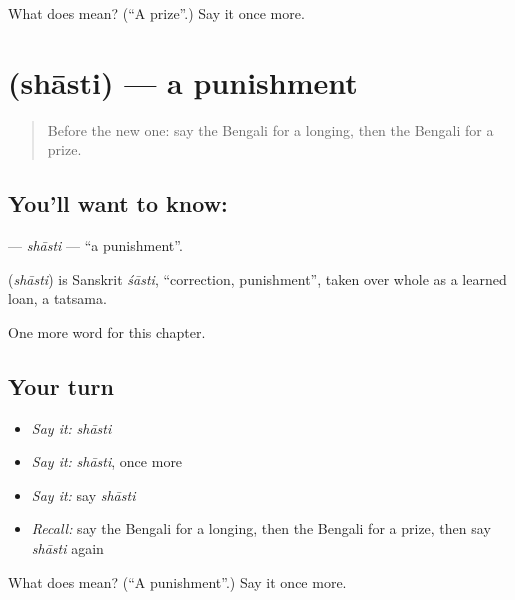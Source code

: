 \begin{tcolorbox}[breakable,colback=teal!4,colframe=teal!35!black,title={Before you move on}]
What does  mean? (\textquotedblleft{}A prize\textquotedblright{}.) Say it once more.
\end{tcolorbox}
\section[\texorpdfstring{\bn{শাস্তি} (shāsti)}{শাস্তি (shāsti)}]{ (shāsti) — a punishment}

\label{lesson:BN-C260-shasti}



\begin{quote}
Before the new one: say the Bengali for a longing, then the Bengali for a prize.
\end{quote}

\subsection*{You'll want to know: }
\textbf{} — \emph{shāsti} — \textquotedblleft{}a punishment\textquotedblright{}.

\begin{cousinweb}
\textbf{} (\emph{shāsti}) is Sanskrit \emph{śāsti}, \textquotedblleft{}correction, punishment\textquotedblright{}, taken over whole as a learned loan, a tatsama.
\end{cousinweb}

\begin{grammarlens}[title={What you've built}]
One more word for this chapter.
\end{grammarlens}

\subsection*{Your turn}
\begin{itemize}
\raggedright
  \item \emph{Say it:} \emph{shāsti}
  \item \emph{Say it:} \emph{shāsti}, once more
  \item \emph{Say it:} say \emph{shāsti}
  \item \emph{Recall:} say the Bengali for a longing, then the Bengali for a prize, then say \emph{shāsti} again
\end{itemize}

\begin{tcolorbox}[breakable,colback=teal!4,colframe=teal!35!black,title={Before you move on}]
What does  mean? (\textquotedblleft{}A punishment\textquotedblright{}.) Say it once more.
\end{tcolorbox}
